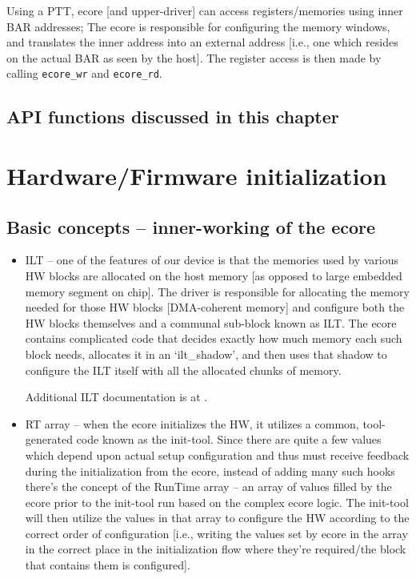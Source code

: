 \documentclass[11pt,fleqn,hidelinks,oneside]{book} %
\makeatletter
\newcommand{\myindex}[1]
	{\index{#1@\texttt{#1}}#1}
\newcommand{\ChapterFuncs}{}
\newenvironment{bottompar}{\par\vspace*{\fill}}{\clearpage}
\newcommand{\SpillChapterFuncs}%
{%
\section{API functions discussed in this chapter}
\ChapterFuncs{}%
\renewcommand{\ChapterFuncs}{}}
\makeatother
\begin{document}
Using a PTT, ecore [and upper-driver] can access registers/memories using inner BAR addresses; The ecore is responsible for configuring the memory windows, and translates the inner address into an external address [i.e., one which resides on the actual BAR as seen by the host]. The register access is then made by calling \texttt{ecore\_wr} and \texttt{ecore\_rd}.
\SpillChapterFuncs


\chapter{Hardware/Firmware initialization}
\label{cha:hwinit}

\section{Basic concepts -- inner-working of the ecore}
\begin{itemize}
	\item \myindex{ILT} – one of the features of our device is that the memories used by various HW blocks are allocated on the host memory [as opposed to large embedded memory segment on chip]. The driver is responsible for allocating the memory needed for those HW blocks [DMA-coherent memory] and configure both the HW blocks themselves and a communal sub-block known as ILT. The ecore contains complicated code that decides exactly how much memory each such block needs, allocates it in an ‘ilt\_shadow’, and then uses that shadow to configure the ILT itself with all the allocated chunks of memory. 
	
Additional ILT documentation is at \cite{doc:ILT}.	

	\item \myindex{RT array} – when the ecore initializes the HW, it utilizes a common, tool-generated code known as the init-tool. Since there are quite a few values which depend upon actual setup configuration and thus must receive feedback during the initialization from the ecore, instead of adding many such hooks there’s the concept of the RunTime array – an array of values filled by the ecore prior to the init-tool run based on the complex ecore logic. The init-tool will then utilize the values in that array to configure the HW according to the correct order of configuration [i.e., writing the values set by ecore in the array in the correct place in the initialization flow where they’re required/the block that contains them is configured].
\end{itemize}
\end{document}
